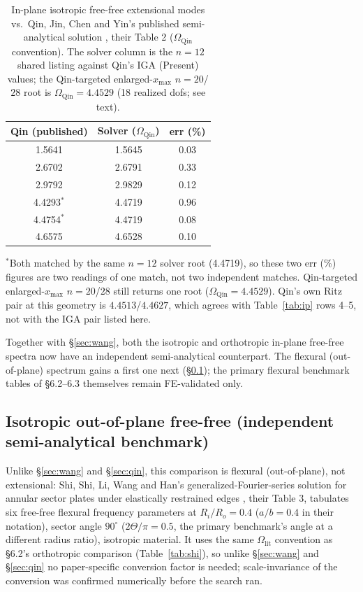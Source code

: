 \documentclass[11pt]{article}
\begin{document}
\begin{table}[!htb]\centering\footnotesize
\renewcommand{\arraystretch}{0.92}
\caption{In-plane isotropic free-free extensional modes vs.\ Qin, Jin,
Chen and Yin's published semi-analytical solution \cite{qin2018}, their Table 2
($\Omega_{\mathrm{Qin}}$ convention). The solver column is the $n{=}12$
shared listing against Qin's IGA (Present) values; the Qin-targeted
enlarged-$x_{\max}$ $n{=}20$/$28$ root is $\Omega_{\mathrm{Qin}}=4.4529$
(18 realized dofs; see text).}
\label{tab:qin}
\begin{tabular}{ccc}
\toprule Qin (published) & Solver ($\Omega_{\mathrm{Qin}}$) & err (\%)\\ \midrule
1.5641 & 1.5645 & 0.03\\
2.6702 & 2.6791 & 0.33\\
2.9792 & 2.9829 & 0.12\\
4.4293$^\ast$ & 4.4719 & 0.96\\
4.4754$^\ast$ & 4.4719 & 0.08\\
4.6575 & 4.6528 & 0.10\\
\bottomrule
\end{tabular}

\renewcommand{\arraystretch}{1}
{\footnotesize $^\ast$Both matched by the same $n{=}12$ solver root (4.4719),
so these two err (\%) figures are two readings of one match, not two
independent matches. Qin-targeted enlarged-$x_{\max}$ $n{=}20$/$28$ still
returns one root ($\Omega_{\mathrm{Qin}}=4.4529$). Qin's own Ritz pair at
this geometry is $4.4513$/$4.4627$, which agrees with
Table~\ref{tab:ip} rows 4--5, not with the IGA pair listed here.}
\end{table}

Together with \S\ref{sec:wang}, both the isotropic and orthotropic
in-plane free-free spectra now have an independent semi-analytical
counterpart. The flexural (out-of-plane) spectrum gains a first one next
(\S\ref{sec:shi2014oop}); the primary flexural benchmark tables of
\S6.2--6.3 themselves remain FE-validated only.

\subsection{Isotropic out-of-plane free-free (independent semi-analytical
benchmark)}\label{sec:shi2014oop}
Unlike \S\ref{sec:wang} and \S\ref{sec:qin}, this comparison is flexural
(out-of-plane), not extensional: Shi, Shi, Li, Wang and Han's
generalized-Fourier-series solution for annular sector plates under
elastically restrained edges \cite{shi2014sector}, their Table 3, tabulates six
free-free flexural frequency parameters at $R_i/R_o=0.4$ ($a/b=0.4$ in
their notation), sector angle $90^\circ$ ($2\Theta/\pi=0.5$, the primary
benchmark's angle at a different radius ratio), isotropic material. It
uses the same $\Omega_{\mathrm{lit}}$ convention as \S6.2's orthotropic
comparison (Table~\ref{tab:shi}), so unlike \S\ref{sec:wang} and
\S\ref{sec:qin} no paper-specific conversion factor is needed;
scale-invariance of the conversion was confirmed numerically before the
search ran.
\end{document}
